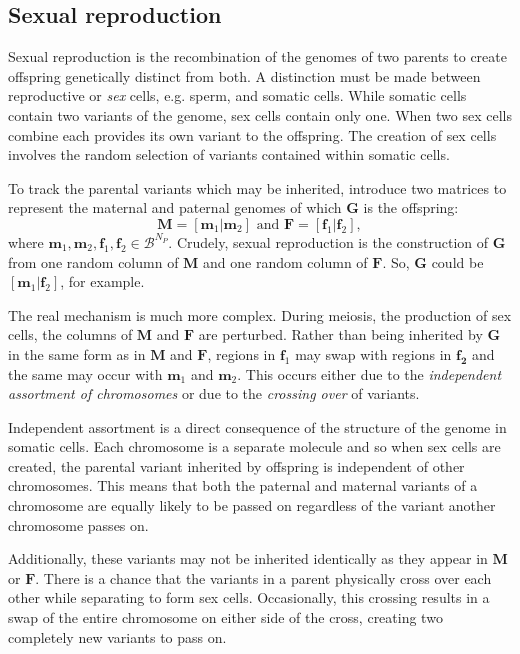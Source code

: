 \documentclass{article}
\newcommand{\ve}[1]{\mathbf{#1}}           %
\newcommand{\m}[1]{\mathbf{#1}}               %
\begin{document}
\subsection{Sexual reproduction} \label{subsec:crossingover}

Sexual reproduction is the recombination of the genomes of two parents to create offspring genetically distinct from both. A distinction must be made between reproductive or \emph{sex} cells, e.g. sperm, and somatic cells. While somatic cells contain two variants of the genome, sex cells contain only one. When two sex cells combine each provides its own variant to the offspring. The creation of sex cells involves the random selection of variants contained within somatic cells.

To track the parental variants which may be inherited, introduce two matrices to represent the maternal and paternal genomes of which $\m{G}$ is the offspring:
$$\m{M} = [\ve{m}_1| \ve{m}_2] \text{ and } \m{F} = [\ve{f}_1| \ve{f}_2],$$
where $\ve{m}_1, \ve{m}_2, \ve{f}_1, \ve{f}_2 \in \mathcal{B}^{N_P}$. Crudely, sexual reproduction is the construction of $\m{G}$ from one random column of $\m{M}$ and one random column of $\m{F}$. So, $\m{G}$ could be $[\ve{m}_1 | \ve{f}_2]$, for example.

The real mechanism is much more complex. During meiosis, the production of sex cells, the columns of $\m{M}$ and $\m{F}$ are perturbed. Rather than being inherited by $\m{G}$ in the same form as in $\m{M}$ and $\m{F}$, regions in $\ve{f}_1$ may swap with regions in $\ve{f_2}$ and the same may occur with $\ve{m}_1$ and $\ve{m}_2$. This occurs either due to the \emph{independent assortment of chromosomes} or due to the \emph{crossing over} of variants.

Independent assortment is a direct consequence of the structure of the genome in somatic cells. Each chromosome is a separate molecule and so when sex cells are created, the parental variant inherited by offspring is independent of other chromosomes. This means that both the paternal and maternal variants of a chromosome are equally likely to be passed on regardless of the variant another chromosome passes on.

Additionally, these variants may not be inherited identically as they appear in $\m{M}$ or $\m{F}$. There is a chance that the variants in a parent physically cross over each other while separating to form sex cells. Occasionally, this crossing results in a swap of the entire chromosome on either side of the cross, creating two completely new variants to pass on.
\end{document}
